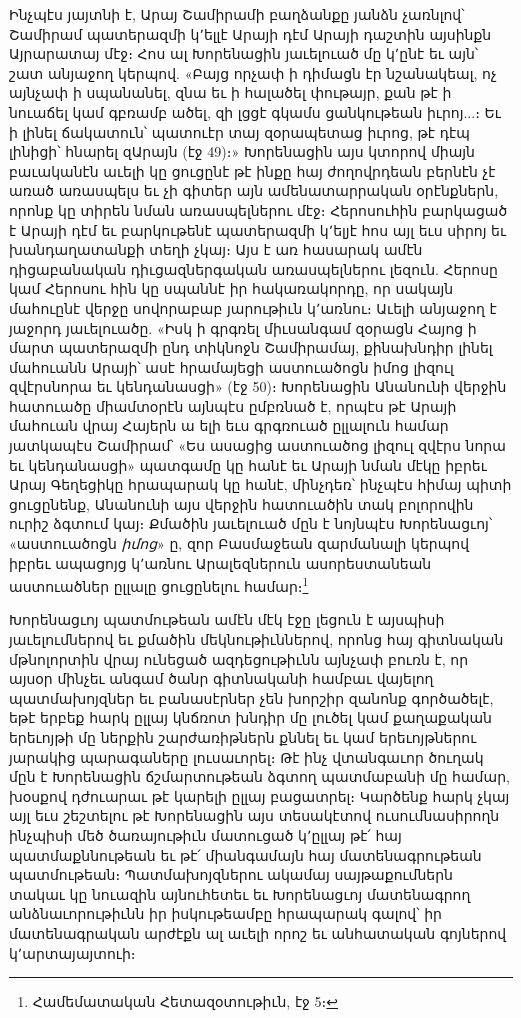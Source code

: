 \documentclass{article}
\begin{document}
{Ինչպէս յայտնի է, Արայ Շամիրամի բաղձանքը յանձն չառնլով՝ Շամիրամ պատերազմի կ՚ելլէ Արայի դէմ Արայի դաշտին այսինքն Այրարատայ մէջ։ Հոս ալ Խորենացին յաւելուած մը կ՚ընէ եւ այն՝ շատ անյաջող կերպով. «Բայց որչափ ի դիմացն էր նշանակեալ, ոչ այնչափ ի սպանանել, զնա եւ ի հալածել փութայր, քան թէ ի նուաճել կամ գբռամբ ածել, զի լցցէ գկամս ցանկութեան իւրոյ...։ Եւ ի լինել ճակատուն՝ պատուէր տայ զօրապետաց իւրոց, թէ դէպ լինիցի՝ հնարել զԱրայն (էջ 49)։» Խորենացին այս կտորով միայն բաւականէն աւելի կը ցուցընէ թէ ինքը հայ ժողովրդեան բերնէն չէ առած առասպելս եւ չի գիտեր այն ամենատարրական օրէնքներն, որոնք կը տիրեն նման առասպելներու մէջ։ Հերոսուհին բարկացած է Արայի դէմ եւ բարկութենէ պատերազմի կ՚ելյէ հոս այլ եւս սիրոյ եւ խանդաղատանքի տեղի չկայ։ Այս է առ հասարակ ամէն դիցաբանական դիւցազներգական առասպելներու լեզուն. Հերոսը կամ Հերոսու հին կը սպաննէ իր հակառակորդը, որ սակայն մահուընէ վերջը սովորաբաբ յարութիւն կ՚առնու։ Աւելի անյաջող է յաջորդ յաւելուածը. «Իսկ ի գրգռել միւսանգամ զօրացն Հայոց ի մարտ պատերազմի ընդ տիկնոջն Շամիրամայ, քինախնդիր լինել մահուանն Արայի՝ ասէ հրամայեցի աստուածոցն իմոց լիզուլ զվէրսնորա եւ կենդանասցի» (էջ 50)։ Խորենացին Անանունի վերջին հատուածը միամտօրէն այնպէս ըմբռնած է, որպէս թէ Արայի մահուան վրայ Հայերն ա ելի եւս գրգռուած ըլլալուն համար յատկապէս Շամիրամ՝ «Ես ասացից աստուածոց լիզուլ զվէրս նորա եւ կենդանասցի» պատգամը կը հանէ եւ Արայի նման մէկը իբրեւ Արայ Գեղեցիկը հրապարակ կը հանէ, մինչդեռ՝ ինչպէս հիմայ պիտի ցուցընենք, Անանունի այս վերջին հատուածին տակ բոլորովին ուրիշ ձգտում կայ։ Քմածին յաւելուած մըն է նոյնպէս Խորենացւոյ՝ «աստուածոցն \emph{իմոց}» ը, զոր Բասմաջեան զարմանալի կերպով իբրեւ ապացոյց կ՚առնու Արալեզներուն ասորեստանեան աստուածներ ըլլալը ցուցընելու համար։\footnote{Համեմատական Հետազօտութիւն, էջ 5։}

Խորենացւոյ պատմութեան ամէն մէկ էջը լեցուն է այսպիսի յաւելումներով եւ քմածին մեկնութիւններով, որոնց հայ գիտնական մթնոլորտին վրայ ունեցած ազդեցութիւնն այնչափ բուռն է, որ այսօր մինչեւ անգամ ծանր գիտնականի համբաւ վայելող պատմախոյզներ եւ բանասէրներ չեն խորշիր զանոնք գործածելէ, եթէ երբեք հարկ ըլլայ կնճռոտ խնդիր մը լուծել կամ քաղաքական երեւոյթի մը ներքին շարժառիթներն քննել եւ կամ երեւոյթներու յարակից պարագաները լուսաւորել։ Թէ ինչ վտանգաւոր ծուղակ մըն է Խորենացին ճշմարտութեան ձգտող պատմաբանի մը համար, խօսքով դժուարաւ թէ կարելի ըլլայ բացատրել։ Կարծենք հարկ չկայ այլ եւս շեշտելու թէ Խորենացին այս տեսակէտով ուսումնասիրողն ինչպիսի մեծ ծառայութիւն մատուցած կ՚ըլլայ թէ՛ հայ պատմաքննութեան եւ թէ՛ միանգամայն հայ մատենագրութեան պատմութեան։ Պատմախոյզներու ակամայ սայթաքումներն տակաւ կը նուազին այնուհետեւ եւ Խորենացւոյ մատենագրող անձնաւորութիւնն իր իսկութեամբը հրապարակ գալով՝ իր մատենագրական արժէքն ալ աւելի որոշ եւ անհատական գոյներով կ՚արտայայտուի։

}
\end{document}
